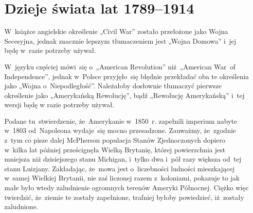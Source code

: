 \documentclass[a4paper,11pt]{article}
\begin{document}
\vspace{\spaceTwo}










\section{Dzieje świata lat 1789--1914}

\vspace{\spaceTwo}






\start W~książce angielskie określenie „Civil War” zostało
przełożone jako Wojna Secesyjna, jednak znacznie lepszym tłumaczeniem
jest „Wojna Domowa” i~jej będę w~razie potrzeby używał.

\vspace{\spaceFour}


\start W~języku częściej mówi~się o~„American Revolution”
niż~„American War~of Independence”, jednak w~Polsce przyjęło~się
błędnie przekładać oba te określenia jako „Wojna o~Niepodległość”.
Należałoby dosłownie tłumaczyć pierwsze określenie jako „Amerykańską
Rewolucję”, bądź „Rewolucję Amerykańską” i~tej wersji będę w razie
potrzeby używał.

\vspace{\spaceFour}


\start {} Podane tu~stwierdzenie, że~Amerykanie w~1850~r.
zapełnili imperium nabyte w~1803 od~Napoleona wydaje~się mocno
przesadzone. Zauważmy, że~zgodnie z~tym co pisze dalej McPherson
populacja Stanów Zjednoczonych dopiero w~kilka lat później
prześcignęła Wielką Brytanię, której powierzchnia jest mniejsza niż
dzisiejszego stanu Michigan, i~tylko dwa i~pół razy większa od~tej
stanu Luizjany. Zakładając, że~mowa jest o~liczebności ludności
mieszkającej w~samej Wielkiej Brytanii, nie zaś liczonej razem
z~koloniami, pokazuje to jak małe było wtedy zaludnienie ogromnych
terenów Ameryki Północnej. Ciężko więc twierdzić, że~ziemie te zostały
zapełnione, trafniej byłoby powiedzieć, iż~zostały zaludnione.
\end{document}
